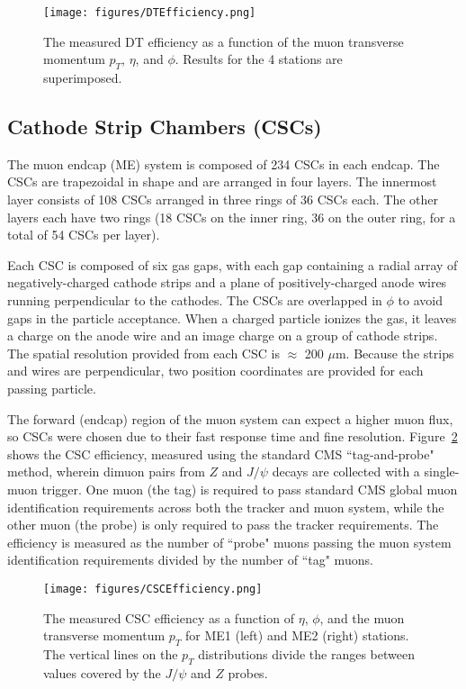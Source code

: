 \begin{figure}\centering
  \texttt{[image: figures/DTEfficiency.png]}
  \caption{\label{fig:DTEfficiency} The measured DT efficiency as a function of the muon transverse momentum $p_T$,
$\eta$, and $\phi$. Results for the 4 stations are superimposed.}
\end{figure}

\subsection{Cathode Strip Chambers (CSCs)}

The muon endcap (ME) system is composed of 234 CSCs in each endcap. The CSCs are trapezoidal in shape and are arranged in four layers. The innermost layer consists of 108 CSCs arranged in three rings of 36 CSCs each. The other layers each have two rings (18 CSCs on the inner ring, 36 on the outer ring, for a total of 54 CSCs per layer).\cite{Muon}

Each CSC is composed of six gas gaps, with each gap containing a radial array of negatively-charged cathode strips and a plane of positively-charged anode wires running perpendicular to the cathodes. The CSCs are overlapped in $\phi$ to avoid gaps in the particle acceptance. When a charged particle ionizes the gas, it leaves a charge on the anode wire and an image charge on a group of cathode strips. The spatial resolution provided from each CSC is $\approx$ 200 $\mu$m. Because the strips and wires are perpendicular, two position coordinates are provided for each passing particle.

The forward (endcap) region of the muon system can expect a higher muon flux, so CSCs were chosen due to their fast response time and fine resolution. Figure~\ref{fig:CSCEfficiency} shows the CSC efficiency, measured using the standard CMS ``tag-and-probe" method, wherein dimuon pairs from $Z$ and $J/\psi$ decays are collected with a single-muon trigger. One muon (the tag) is required to pass standard CMS global muon identification requirements across both the tracker and muon system, while the other muon (the probe) is only required to pass the tracker requirements. The efficiency is measured as the number of ``probe" muons passing the muon system identification requirements divided by the number of ``tag" muons.\cite{Muon}

\begin{figure}\centering
  \texttt{[image: figures/CSCEfficiency.png]}
  \caption{\label{fig:CSCEfficiency} The measured CSC efficiency as a function of $\eta$, $\phi$, and the muon transverse momentum $p_T$ for ME1 (left) and ME2 (right) stations. The vertical lines on the $p_T$ distributions divide the ranges between values covered by the $J/\psi$ and $Z$ probes.}
\end{figure}

